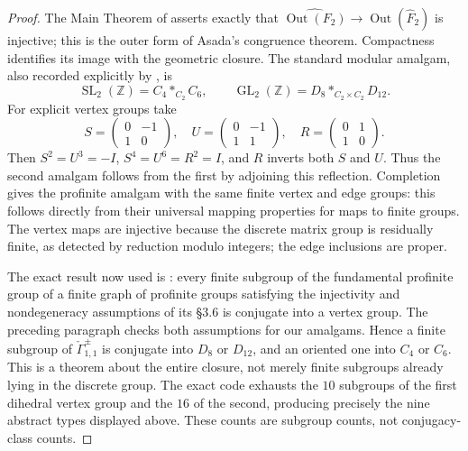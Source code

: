 \begin{proof}
The Main Theorem of \citet[p.~2 of the primary arXiv version]{BuxErshovRapinchuk2011}
asserts exactly that
$\widehat{\operatorname{Out}(F_2)}\to
\operatorname{Out}(\widehat F_2)$ is injective; this is the
outer form of Asada's congruence theorem. Compactness identifies
its image with the geometric closure.
The standard modular amalgam, also recorded explicitly by
\citet[p.~3]{Zimmermann2021}, is
\[
 \operatorname{SL}_2(\mathbb Z)=C_4*_{C_2}C_6,
 \qquad
 \operatorname{GL}_2(\mathbb Z)=D_8*_{C_2\times C_2}D_{12}.
\]
For explicit vertex groups take
\[
 S=\begin{pmatrix}0&-1\\1&0\end{pmatrix},\quad
 U=\begin{pmatrix}0&-1\\1&1\end{pmatrix},\quad
 R=\begin{pmatrix}0&1\\1&0\end{pmatrix}.
\]
Then $S^2=U^3=-I$, $S^4=U^6=R^2=I$, and $R$
inverts both $S$ and $U$. Thus the second amalgam follows
from the first by adjoining this reflection. Completion
gives the profinite amalgam with the same finite vertex and
edge groups: this follows directly from their universal
mapping properties for maps to finite groups. The vertex
maps are injective because the discrete matrix group is
residually finite, as detected by reduction modulo integers;
the edge inclusions are proper.

The exact result now used is
\citet[Theorem 3.10, p.~421]{ZalesskiiMelnikov1989}:
every finite subgroup of the fundamental profinite group of
a finite graph of profinite groups satisfying the injectivity
and nondegeneracy assumptions of its \S3.6 is conjugate into
a vertex group. The preceding paragraph checks both
assumptions for our amalgams. Hence a finite subgroup of
$\check\Gamma_{1,1}^{\pm}$ is conjugate into $D_8$ or
$D_{12}$, and an oriented one into $C_4$ or $C_6$.
This is a theorem about the entire closure, not merely
finite subgroups already lying in the discrete group.
The exact code exhausts the $10$ subgroups of the first
dihedral vertex group and the $16$ of the second, producing
precisely the nine abstract types displayed above. These
counts are subgroup counts, not conjugacy-class counts.


\end{proof}
